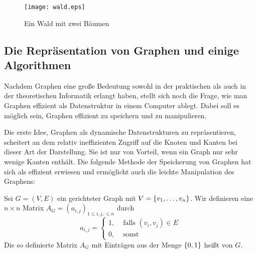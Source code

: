 \begin{figure}
\begin{center}
\texttt{[image: wald.eps]}
\end{center}
\caption{Ein Wald mit zwei Bäumen}
\label{wald}
\end{figure}

\subsection{Die Repräsentation von Graphen und einige Algorithmen}
Nachdem Graphen eine große Bedeutung sowohl in der praktischen als
auch in der theoretischen Informatik erlangt haben, stellt sich noch
die Frage, wie man Graphen effizient als Datenstruktur in einem
Computer ablegt. Dabei soll es möglich sein, Graphen effizient zu
speichern und zu manipulieren. 

Die erste Idee, Graphen als dynamische Datenstrukturen zu
repräsentieren, scheitert an dem relativ ineffizienten Zugriff auf die
Knoten und Kanten bei dieser Art der Darstellung. Sie ist nur von
Vorteil, wenn ein Graph nur sehr wenige Kanten enthält. Die folgende
Methode der Speicherung von Graphen hat sich als effizient erwiesen
und ermöglicht auch die leichte Manipulation des Graphens:
\begin{definition}
Sei $G=(V,E)$ ein gerichteter Graph mit $V = \{{v_{1}}, \allowbreak \dots , \allowbreak{v_{n}}\}$. Wir
definieren eine $n \times n$ Matrix $A_G =(a_{i,j})_{1 \le i,j, \le
n}$ durch
\begin{displaymath}
a_{i,j} =
\left\{
\begin{array}{ll}
1,& \text{ falls $(v_i, v_j) \in E$}\\
0,& \text{ sonst}
\end{array}
\right.
\end{displaymath}
Die so definierte Matrix $A_G$ mit Einträgen aus der Menge $\{0,1\}$
heißt  von $G$.
\end{definition}

